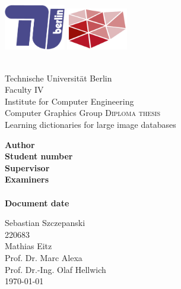 
\begin{titlepage}


\includegraphics[width=0.2\textwidth]{images/logo/tu-logo_2d_blau.png}
\hfill
\includegraphics[width=0.2\textwidth]{images/logo/dgm_red.pdf}\\
\vspace{20pt}\\
\begin{center} 
Technische Universit\"{a}t Berlin\\
Faculty IV\\
Institute for Computer Engineering\\
Computer Graphics Group
\vfill
\textsc{\Large Diploma thesis}\\[0.5cm]
{\huge Learning dictionaries for large image databases}\\
[0.4cm]


\vfill
\begin{minipage}[t]{0.48\textwidth}
\flushright
\textbf{Author}\\
\textbf{Student number}\\
\textbf{Supervisor}\\
\textbf{Examiners}\\
\textbf{}\\
\textbf{Document date}
\end{minipage}
\begin{minipage}[t]{0.48\textwidth}
\flushleft 
Sebastian Szczepanski\\
220683\\
Mathias Eitz\\
Prof. Dr. Marc Alexa\\
Prof. Dr.-Ing. Olaf Hellwich\\
\today{}
\end{minipage}
\end{center}

\end{titlepage}

\clearpage

